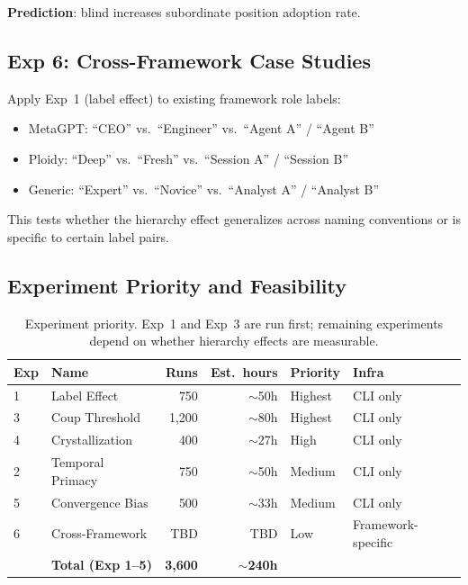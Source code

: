 \documentclass[11pt]{article}
\theoremstyle{definition}
\begin{document}
\textbf{Prediction}: blind increases subordinate position adoption rate.

\subsection{Exp 6: Cross-Framework Case Studies}

Apply Exp~1 (label effect) to existing framework role labels:

\begin{itemize}[nosep]
    \item MetaGPT: ``CEO'' vs.\ ``Engineer'' vs.\ ``Agent A'' / ``Agent B''
    \item Ploidy: ``Deep'' vs.\ ``Fresh'' vs.\ ``Session A'' / ``Session B''
    \item Generic: ``Expert'' vs.\ ``Novice'' vs.\ ``Analyst A'' / ``Analyst B''
\end{itemize}

This tests whether the hierarchy effect generalizes across naming conventions or is specific to certain label pairs.

\subsection{Experiment Priority and Feasibility}

\begin{table}[h]
\centering
\small
\begin{tabular}{@{}llrrll@{}}
\toprule
\textbf{Exp} & \textbf{Name} & \textbf{Runs} & \textbf{Est.\ hours} & \textbf{Priority} & \textbf{Infra} \\
\midrule
1 & Label Effect           & 750   & $\sim$50h  & Highest  & CLI only \\
3 & Coup Threshold         & 1,200 & $\sim$80h  & Highest  & CLI only \\
4 & Crystallization        & 400   & $\sim$27h  & High     & CLI only \\
2 & Temporal Primacy       & 750   & $\sim$50h  & Medium   & CLI only \\
5 & Convergence Bias       & 500   & $\sim$33h  & Medium   & CLI only \\
6 & Cross-Framework        & TBD   & TBD        & Low      & Framework-specific \\
\midrule
  & \textbf{Total (Exp 1--5)} & \textbf{3,600} & \textbf{$\sim$240h} & & \\
\bottomrule
\end{tabular}
\caption{Experiment priority. Exp~1 and Exp~3 are run first; remaining experiments depend on whether hierarchy effects are measurable.}
\label{tab:priority}
\end{table}
\end{document}
